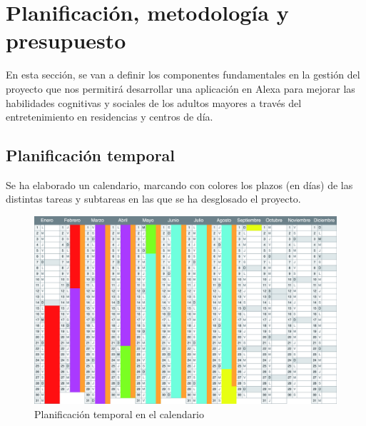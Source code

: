\section{Planificación, metodología y presupuesto}

En esta sección, se van a definir los componentes fundamentales en la gestión del proyecto que nos permitirá desarrollar una aplicación en Alexa para mejorar las habilidades cognitivas y sociales de los adultos mayores a través del entretenimiento en residencias y centros de día.

\subsection{Planificación temporal}

Se ha elaborado un calendario, marcando con colores los plazos (en días) de las distintas tareas y subtareas en las que se ha desglosado el proyecto.

\begin{figure}[H]
	\centering
	\includegraphics[width=1\textwidth]{imgs/tabla-planning1.jpg}
	\caption{Planificación temporal en el calendario}
	\label{fig:planning1}
\end{figure}

